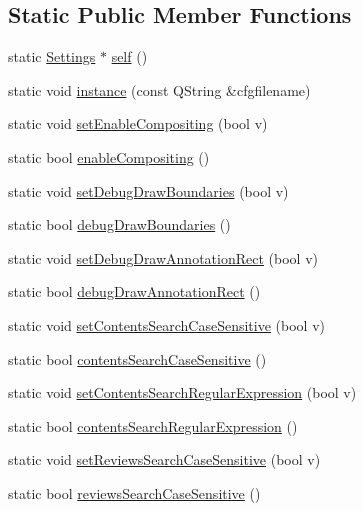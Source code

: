 \subsection*{Static Public Member Functions}
\begin{DoxyCompactItemize}
\item 
static \hyperlink{classOkular_1_1Settings}{Settings} $\ast$ \hyperlink{classOkular_1_1Settings_ae6f72bd2023f2f684f59bca5dde6617c}{self} ()
\item 
static void \hyperlink{classOkular_1_1Settings_abbb545088027d7de160764628c19a616}{instance} (const Q\+String \&cfgfilename)
\item 
static void \hyperlink{classOkular_1_1Settings_a871fc688071e0e19053a25f3d6c38624}{set\+Enable\+Compositing} (bool v)
\item 
static bool \hyperlink{classOkular_1_1Settings_a975dbba9c56b1a9df965dd2766aefc60}{enable\+Compositing} ()
\item 
static void \hyperlink{classOkular_1_1Settings_ab52d70bfb99cce68253be8264a4d37d6}{set\+Debug\+Draw\+Boundaries} (bool v)
\item 
static bool \hyperlink{classOkular_1_1Settings_a21cc1aa57a32a43b985d916fa0f2b7ae}{debug\+Draw\+Boundaries} ()
\item 
static void \hyperlink{classOkular_1_1Settings_a63ac8ea4575f56acd43b9b42f1a78a9c}{set\+Debug\+Draw\+Annotation\+Rect} (bool v)
\item 
static bool \hyperlink{classOkular_1_1Settings_a2efc0bc534162c18db5c09c91e9b41fb}{debug\+Draw\+Annotation\+Rect} ()
\item 
static void \hyperlink{classOkular_1_1Settings_a03b3eb06978d9132200a716cd698b7d9}{set\+Contents\+Search\+Case\+Sensitive} (bool v)
\item 
static bool \hyperlink{classOkular_1_1Settings_a7e3c3e1cc78df41df617b0ccbb58679b}{contents\+Search\+Case\+Sensitive} ()
\item 
static void \hyperlink{classOkular_1_1Settings_a4c8d253069ed9fdcc7de1a36e4aa2376}{set\+Contents\+Search\+Regular\+Expression} (bool v)
\item 
static bool \hyperlink{classOkular_1_1Settings_aeaa31cc9210d911e12970b80b72ef04e}{contents\+Search\+Regular\+Expression} ()
\item 
static void \hyperlink{classOkular_1_1Settings_af062f9a4ee74108901d5777f4db0e33c}{set\+Reviews\+Search\+Case\+Sensitive} (bool v)
\item 
static bool \hyperlink{classOkular_1_1Settings_a04c846ea3aefebbdb44866fce7f6f304}{reviews\+Search\+Case\+Sensitive} ()

\end{DoxyCompactItemize}
